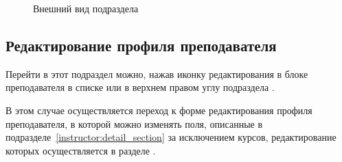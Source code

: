 	\begin{figure}[H]
	\caption{Внешний вид подраздела }
	\label{instructor:detail}
	\end{figure}
	
\subsection{Редактирование профиля преподавателя}\label{instructor:edit_section}
Перейти в этот подраздел можно, нажав иконку редактирования  в блоке преподавателя в списке или в верхнем правом углу подраздела .


В этом случае осуществляется переход к форме редактирования профиля преподавателя, в которой можно изменять поля, описанные в подразделе~\ref{instructor:detail_section} за исключением курсов, редактирование которых осуществляется в разделе . 

